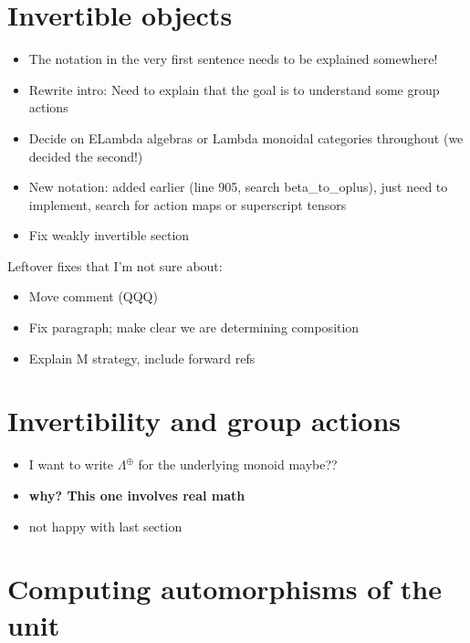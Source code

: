 \documentclass{amsart}
\begin{document}
\section{ Invertible objects}

\begin{itemize}
\item The notation in the very first sentence needs to be explained somewhere!
\item Rewrite intro: Need to explain that the goal is to understand some group actions
\item Decide on ELambda algebras or Lambda monoidal categories throughout (we decided the second!)
\item New notation: added earlier (line 905, search beta\_to\_oplus), just need to implement, search for action maps or superscript tensors
\item Fix weakly invertible section
\end{itemize}

Leftover fixes that I'm not sure about:
\begin{itemize}
\item Move comment (QQQ)
\item Fix paragraph; make clear we are determining composition
\item Explain M strategy, include forward refs
\end{itemize}



\section{ Invertibility and group actions}

\begin{itemize}
\item I want to write $\Lambda^{\oplus}$ for the underlying monoid maybe??
\item \textbf{why? This one involves real math}
\item not happy with last section
\end{itemize}



\section{ Computing automorphisms of the unit}
\end{document}
